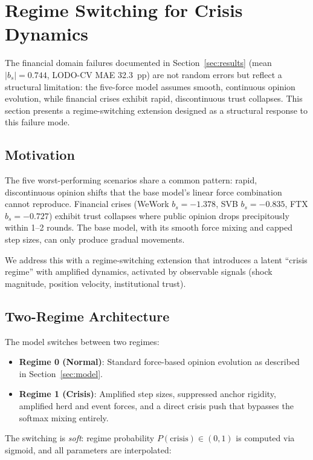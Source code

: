 \documentclass[12pt]{article}
\begin{document}
\section{Regime Switching for Crisis Dynamics}
\label{sec:regime}

The financial domain failures documented in Section~\ref{sec:results} (mean $|b_s| = 0.744$, LODO-CV MAE 32.3~pp) are not random errors but reflect a structural limitation: the five-force model assumes smooth, continuous opinion evolution, while financial crises exhibit rapid, discontinuous trust collapses. This section presents a regime-switching extension designed as a structural response to this failure mode.

\subsection{Motivation}

The five worst-performing scenarios share a common pattern: rapid, discontinuous opinion shifts that the base model's linear force combination cannot reproduce. Financial crises (WeWork $b_s = -1.378$, SVB $b_s = -0.835$, FTX $b_s = -0.727$) exhibit trust collapses where public opinion drops precipitously within 1--2 rounds. The base model, with its smooth force mixing and capped step sizes, can only produce gradual movements.

We address this with a regime-switching extension that introduces a latent ``crisis regime'' with amplified dynamics, activated by observable signals (shock magnitude, position velocity, institutional trust).

\subsection{Two-Regime Architecture}

The model switches between two regimes:

\begin{itemize}
    \item \textbf{Regime 0 (Normal)}: Standard force-based opinion evolution as described in Section~\ref{sec:model}.
    \item \textbf{Regime 1 (Crisis)}: Amplified step sizes, suppressed anchor rigidity, amplified herd and event forces, and a direct crisis push that bypasses the softmax mixing entirely.
\end{itemize}

The switching is \textit{soft}: regime probability $P(\text{crisis}) \in (0, 1)$ is computed via sigmoid, and all parameters are interpolated:
\end{document}
